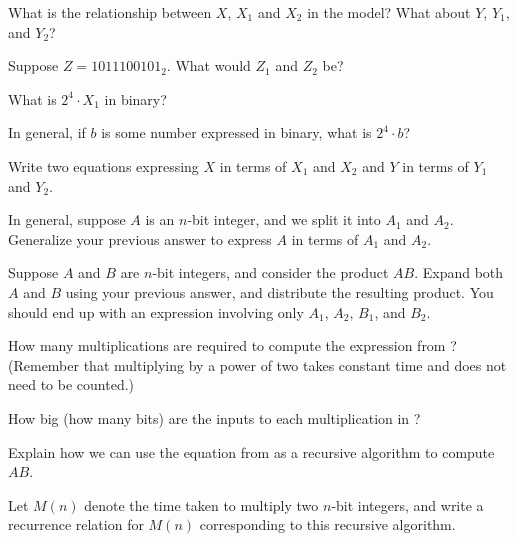 \documentclass{tufte-handout}
\begin{document}
\begin{questions}
\item What is the relationship between $X$, $X_1$ and $X_2$ in the
  model?  What about $Y$, $Y_1$, and $Y_2$?
\item Suppose $Z = 1011100101_2$.  What would $Z_1$ and $Z_2$ be?
\item What is $2^4 \cdot X_1$ in binary?
\item In general, if $b$ is some number expressed in binary, what is
  $2^4 \cdot b$?
\item Write two equations expressing $X$ in terms of $X_1$ and $X_2$
  and $Y$ in terms of $Y_1$ and $Y_2$.
\item In general, suppose $A$ is an $n$-bit integer, and we split it
  into $A_1$ and $A_2$.  Generalize your previous answer to express
  $A$ in terms of $A_1$ and $A_2$.
\newpage
\item \label{q:expr} Suppose $A$ and $B$ are $n$-bit integers, and consider the
  product $AB$. Expand both $A$ and $B$ using your previous answer,
  and distribute the resulting product.  You should end up with an
  expression involving only $A_1$, $A_2$, $B_1$, and $B_2$.
\item How many multiplications are required to compute the expression
  from ? (Remember that multiplying by a power of two
  takes constant time and does not need to be counted.)
\item How big (how many bits) are the inputs to each multiplication in
  ?
\item Explain how we can use the equation from  as a recursive
  algorithm to compute $AB$.
\item Let $M(n)$ denote the time taken to multiply two $n$-bit
  integers, and write a recurrence relation for $M(n)$ corresponding
  to this recursive algorithm.
\end{questions}
\end{document}
